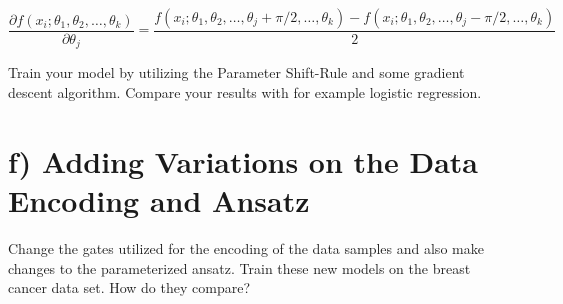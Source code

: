 \documentclass[letterpaper,11pt]{article}
\begin{document}
\begin{equation*}
    \frac{\partial f(x_i; \theta_1, \theta_2, \dots, \theta_k)}{\partial \theta_j}  = \frac{f(x_i; \theta_1, \theta_2, \dots, \theta_j + \pi /2, \dots, \theta_k) -f(x_i; \theta_1, \theta_2, \dots, \theta_j - \pi /2, \dots, \theta_k)}{2}
\end{equation*}

Train your model by utilizing the Parameter Shift-Rule and some gradient descent algorithm. Compare your results with for example logistic regression.


\section*{f) Adding Variations on the Data Encoding and Ansatz}
Change the gates utilized for the encoding of the data samples and also make changes to the parameterized ansatz. Train these new models on the breast cancer data set. How do they compare?


\newpage 

\printbibliography
\end{document}
